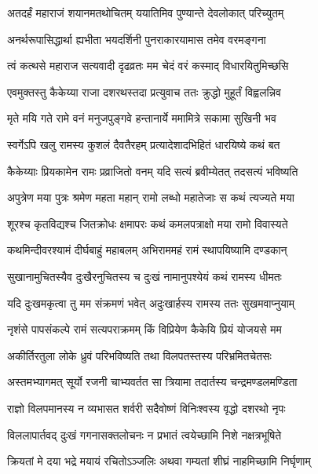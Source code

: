 
\twolineshloka
{अतदर्हं महाराजं शयानमतथोचितम्}
{ययातिमिव पुण्यान्ते देवलोकात् परिच्युतम्} %

\twolineshloka
{अनर्थरूपासिद्धार्था ह्यभीता भयदर्शिनी}
{पुनराकारयामास तमेव वरमङ्गना} %

\twolineshloka
{त्वं कत्थसे महाराज सत्यवादी दृढव्रतः}
{मम चेदं वरं कस्माद् विधारयितुमिच्छसि} %

\twolineshloka
{एवमुक्तस्तु कैकेय्या राजा दशरथस्तदा}
{प्रत्युवाच ततः क्रुद्धो मुहूर्तं विह्वलन्निव} %

\twolineshloka
{मृते मयि गते रामे वनं मनुजपुङ्गवे}
{हन्तानार्ये ममामित्रे सकामा सुखिनी भव} %

\twolineshloka
{स्वर्गेऽपि खलु रामस्य कुशलं दैवतैरहम्}
{प्रत्यादेशादभिहितं धारयिष्ये कथं बत} %

\twolineshloka
{कैकेय्याः प्रियकामेन रामः प्रव्राजितो वनम्}
{यदि सत्यं ब्रवीम्येतत् तदसत्यं भविष्यति} %

\twolineshloka
{अपुत्रेण मया पुत्रः श्रमेण महता महान्}
{रामो लब्धो महातेजाः स कथं त्यज्यते मया} %

\twolineshloka
{शूरश्च कृतविद्यश्च जितक्रोधः क्षमापरः}
{कथं कमलपत्राक्षो मया रामो विवास्यते} %

\twolineshloka
{कथमिन्दीवरश्यामं दीर्घबाहुं महाबलम्}
{अभिराममहं रामं स्थापयिष्यामि दण्डकान्} %

\twolineshloka
{सुखानामुचितस्यैव दुःखैरनुचितस्य च}
{दुःखं नामानुपश्येयं कथं रामस्य धीमतः} %

\twolineshloka
{यदि दुःखमकृत्वा तु मम संक्रमणं भवेत्}
{अदुःखार्हस्य रामस्य ततः सुखमवाप्नुयाम्} %

\twolineshloka
{नृशंसे पापसंकल्पे रामं सत्यपराक्रमम्}
{किं विप्रियेण कैकेयि प्रियं योजयसे मम} %

\twolineshloka
{अकीर्तिरतुला लोके ध्रुवं परिभविष्यति}
{तथा विलपतस्तस्य परिभ्रमितचेतसः} %

\twolineshloka
{अस्तमभ्यागमत् सूर्यो रजनी चाभ्यवर्तत}
{सा त्रियामा तदार्तस्य चन्द्रमण्डलमण्डिता} %

\twolineshloka
{राज्ञो विलपमानस्य न व्यभासत शर्वरी}
{सदैवोष्णं विनिःश्वस्य वृद्धो दशरथो नृपः} %

\twolineshloka
{विललापार्तवद् दुःखं गगनासक्तलोचनः}
{न प्रभातं त्वयेच्छामि निशे नक्षत्रभूषिते} %

\twolineshloka
{क्रियतां मे दया भद्रे मयायं रचितोऽञ्जलिः}
{अथवा गम्यतां शीघ्रं नाहमिच्छामि निर्घृणाम्} %


